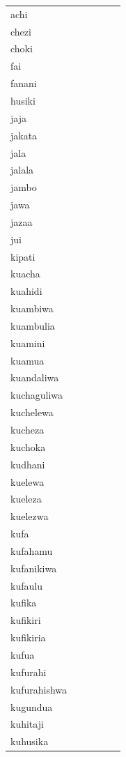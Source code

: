 \documentclass[output=paper,colorlinks,citecolor=brown,
]{langscibook}
\begin{document}
\begin{table}
\begin{footnotesize}


\begin{minipage}{.24\textwidth}
\begin{tabular}{llllll}
achi \\ 
chezi \\ 
choki \\ 
fai \\ 
fanani \\ 
husiki \\ 
jaja \\ 
jakata \\ 
jala \\ 
jalala \\ 
jambo \\ 
jawa \\ 
jazaa \\ 
jui \\ 
kipati \\\hline 
kuacha \\ 
kuahidi \\ 
kuambiwa \\ 
kuambulia \\ 
kuamini \\ 
kuamua \\ 
kuandaliwa \\ 
kuchaguliwa \\ 
kuchelewa \\ 
kucheza \\ 
kuchoka \\ 
kudhani \\ 
kuelewa \\ 
kueleza \\ 
kuelezwa \\ 
kufa \\ 
kufahamu \\ 
kufanikiwa \\ 
kufaulu \\ 
kufika \\ 
kufikiri \\ 
kufikiria \\ 
kufua \\ 
kufurahi \\ 
kufurahishwa \\ 
kugundua \\ 
kuhitaji \\ 
kuhusika \\ 


\end{tabular}
\end{minipage}
\end{footnotesize}
\end{table}
\end{document}
